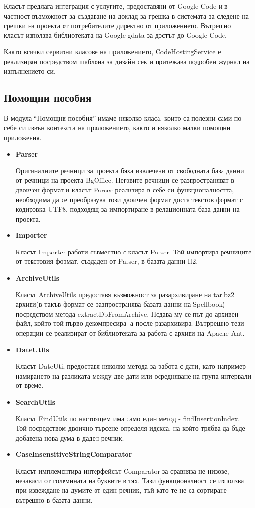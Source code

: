 \begin{itemize}
    Класът предлага интеграция с услугите, предоставяни от Google Code
    и в частност възможност за създаване на доклад за грешка в
    системата за следене на грешки на проекта от потребителите
    директно от приложението. Вътрешно класът използва библиотеката на
    Google gdata за достът до Google Code.

    Както всички сервизни класове на приложението, CodeHostingService е
    реализиран посредством шаблона за дизайн сек и притежава подробен
    журнал на изпълнението си.
\end{itemize}
 
\subsection{Помощни пособия}
В модула "`Помощни пособия"' имаме няколко класа, които са полезни
сами по себе си извън контекста на приложението, както и няколко малки
помощни приложения.
\begin{itemize}
  \item \textbf{Parser}

    Оригиналните речници за проекта бяха извлечени от свободната база
    данни от речници на проекта BgOffice. Неговите речници се
    разпространяват в двоичен формат и класът Parser реализира в себе
    си функционалността, необходима да се преобразува този двоичен
    формат доста текстов формат с кодировка UTF8, подходящ за
    импортиране в релационната база данни на проекта.
  \item \textbf{Importer}

    Класът Importer работи съвместно с класът Parser. Той импортира
    речниците от текстовия формат, създаден от Parser, в базата данни H2.
  \item \textbf{ArchiveUtils}

    Класът ArchiveUtils предоставя възможност за разархивиране на
    tar.bz2 архиви(в такъв формат се разпространява базата данни на
    Spellbook) посредством метода extractDbFromArchive. Подава му се
    път до архивен файл, който той първо декомпресира, а после
    разархивира. Вътррешно тези операции се реализират от библиотеката
    за работа с архиви на Apache Ant.
  \item \textbf{DateUtils}

    Класът DateUtil предоставя няколко метода за работа с дати, като
    например намирането на разликата между две дати или осредняване на
    група интервали от време. 
  \item \textbf{SearchUtils}

    Класът FindUtils по настоящем има само един метод -
    findInsertionIndex. Той посредством двоично търсене определя
    идекса, на който трябва да бъде добавена нова дума в даден
    речник.
  \item \textbf{CaseInsensitiveStringComparator}

    Класът имплементира интерфейсът Comparator за сравнява не низове,
    независи от големината на буквите в тях. Тази функционалност се
    използва при извеждане на думите от един речник, тъй като те не са
    сортиране вътрешно в базата данни.
\end{itemize}

